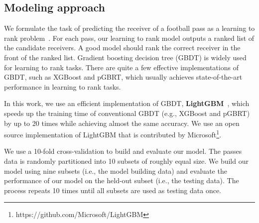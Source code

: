 

\subsection{Modeling approach}\label{model-approach}

We formulate the task of predicting the receiver of a football pass as a learning to rank problem~\cite{liu2009learning}. 
For each pass, our learning to rank model outputs a ranked list of the candidate receivers. 
A good model should rank the correct receiver in the front of the ranked list.
Gradient boosting decision tree (GBDT) is widely used for learning to rank tasks.
There are quite a few effective implementations of GBDT, such as XGBoost and pGBRT, which usually achieves state-of-the-art performance in learning to rank tasks.

In this work, we use an efficient implementation of GBDT, \textbf{LightGBM}~\cite{NIPS2017_6907}, which speeds up the training time of conventional GBDT (e.g., XGBoost and pGBRT) by up to 20 times while achieving almost the same accuracy. 
We use an open source implementation of LightGBM that is contributed by Microsoft\footnote{https://github.com/Microsoft/LightGBM}.

We use a 10-fold cross-validation to build and evaluate our model. 
The passes data is randomly partitioned into 10 subsets of roughly equal size. 
We build our model using nine subsets (i.e., the model building data) and evaluate the performance of our model on the held-out subset (i.e., the testing data).
The process repeats 10 times until all subsets are used as testing data once.

